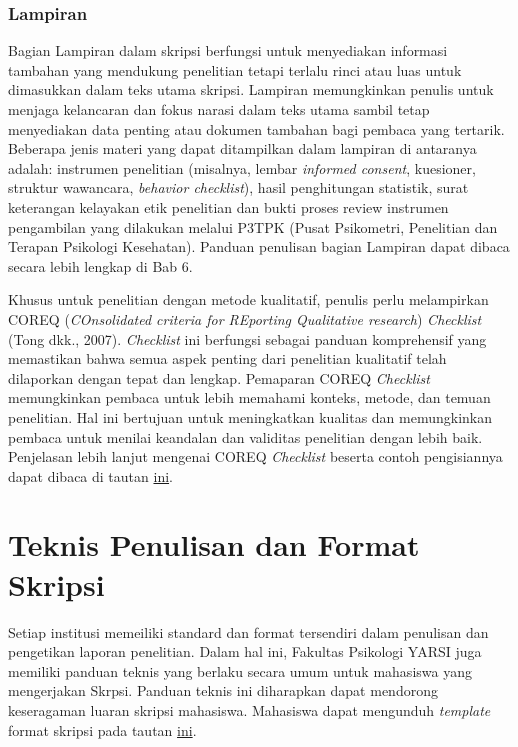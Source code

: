 \documentclass[
  indonesian,
  letterpaper,
]{scrbook}
\begin{document}
\subsection{Lampiran}\label{lampiran}

Bagian Lampiran dalam skripsi berfungsi untuk menyediakan informasi
tambahan yang mendukung penelitian tetapi terlalu rinci atau luas untuk
dimasukkan dalam teks utama skripsi. Lampiran memungkinkan penulis untuk
menjaga kelancaran dan fokus narasi dalam teks utama sambil tetap
menyediakan data penting atau dokumen tambahan bagi pembaca yang
tertarik. Beberapa jenis materi yang dapat ditampilkan dalam lampiran di
antaranya adalah: instrumen penelitian (misalnya, lembar \emph{informed
consent}, kuesioner, struktur wawancara, \emph{behavior checklist}),
hasil penghitungan statistik, surat keterangan kelayakan etik penelitian
dan bukti proses review instrumen pengambilan yang dilakukan melalui
P3TPK (Pusat Psikometri, Penelitian dan Terapan Psikologi Kesehatan).
Panduan penulisan bagian Lampiran dapat dibaca secara lebih lengkap di
Bab 6.

Khusus untuk penelitian dengan metode kualitatif, penulis perlu
melampirkan COREQ (\emph{COnsolidated criteria for REporting Qualitative
research}) \emph{Checklist} (Tong dkk., 2007). \emph{Checklist} ini
berfungsi sebagai panduan komprehensif yang memastikan bahwa semua aspek
penting dari penelitian kualitatif telah dilaporkan dengan tepat dan
lengkap. Pemaparan COREQ \emph{Checklist} memungkinkan pembaca untuk
lebih memahami konteks, metode, dan temuan penelitian. Hal ini bertujuan
untuk meningkatkan kualitas dan memungkinkan pembaca untuk menilai
keandalan dan validitas penelitian dengan lebih baik. Penjelasan lebih
lanjut mengenai COREQ \emph{Checklist} beserta contoh pengisiannya dapat
dibaca di tautan
\href{https://drive.google.com/drive/folders/1T1IgsToy4j0-BKgHVvShJM5zYF14A10C?usp=drive_link}{ini}.


\chapter{Teknis Penulisan dan Format
Skripsi}\label{teknis-penulisan-dan-format-skripsi}

Setiap institusi memeiliki standard dan format tersendiri dalam
penulisan dan pengetikan laporan penelitian. Dalam hal ini, Fakultas
Psikologi YARSI juga memiliki panduan teknis yang berlaku secara umum
untuk mahasiswa yang mengerjakan Skrpsi. Panduan teknis ini diharapkan
dapat mendorong keseragaman luaran skripsi mahasiswa. Mahasiswa dapat
mengunduh \emph{template} format skripsi pada tautan
\href{https://drive.google.com/file/d/1Qxn2S_09NiJaV__Aqd3o9aqdDlvM-dWr/view?usp=sharing}{ini}.
\end{document}
